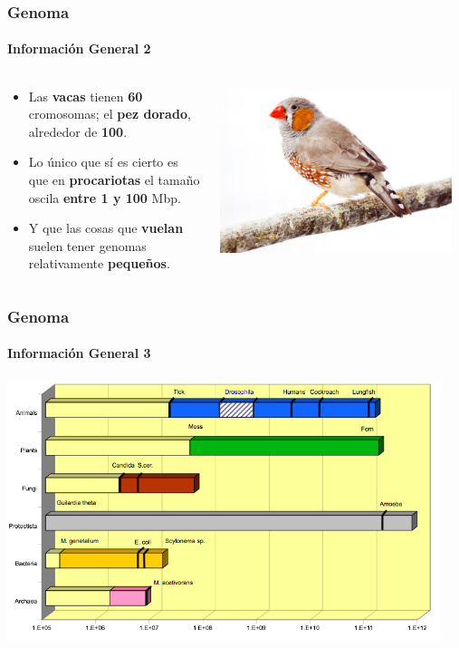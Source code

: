 \begin{frame}
\frametitle{Genoma}
\framesubtitle{Información General 2}
\begin{columns}
\begin{column}{0.7\textwidth}
	\begin{itemize}
	    \item Las \textbf{vacas} tienen \textbf{60} cromosomas; el \textbf{pez
	    dorado}, alrededor de \textbf{100}.
	    \item Lo único que sí es cierto es que en \textbf{procariotas} el tamaño
	    oscila \textbf{entre 1 y 100} Mbp.
	    \item Y que las cosas que \textbf{vuelan} suelen tener genomas
	    relativamente \textbf{pequeños}.
	\end{itemize}
\end{column}
\begin{column}{0.3\textwidth}
\begin{center}
	\includegraphics[width=0.95\textwidth]{img/ave.jpg}\\
\end{center}
\end{column}
\end{columns}
\end{frame}

\begin{frame}
\frametitle{Genoma}
\framesubtitle{Información General 3}
\begin{center}
	\includegraphics[width=0.95\textwidth]{img/gen_clados}
\end{center}
\end{frame}
